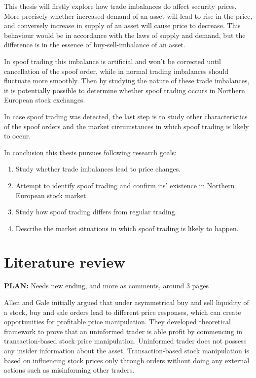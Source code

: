 \documentclass{tut-thesis}
\begin{document}
This thesis will firstly explore how trade imbalances do affect security prices. More precisely whether increased demand of an asset will lead to rise in the price, and conversely increase in supply of an asset will cause price to decrease. This behaviour would be in accordance with the laws of supply and demand, but the difference is in the essence of buy-sell-imbalance of an asset. 

In spoof trading this imbalance is artificial and won't be corrected until cancellation of the spoof order, while in normal trading imbalances should fluctuate more smoothly. Then by studying the nature of these trade imbalances, it is potentially possible to determine whether spoof trading occurs in Northern European stock exchanges. 

In case spoof trading was detected, the last step is to study other characteristics of the spoof orders and the market circumstances in which spoof trading is likely to occur.

In conclusion this thesis pursues following research goals:
\begin{enumerate}
	\item Study whether trade imbalances lead to price changes.
	\item Attempt to identify spoof trading and confirm its' existence in Northern European stock market.
	\item Study how spoof trading differs from regular trading.
	\item Describe the market situations in which spoof trading is likely to happen.
\end{enumerate}

\section{Literature review}
\textbf{PLAN:} Needs new ending, and more as comments, around 3 pages

Allen and Gale \parencite*{AllenGale1992} initially argued that under asymmetrical buy and sell liquidity of a stock, buy and sale orders lead to different price responses, which can create opportunities for profitable price manipulation. They developed theoretical framework to prove that an uninformed trader is able profit by commencing in transaction-based stock price manipulation. Uninformed trader does not possess any insider information about the asset. Transaction-based stock manipulation is based on influencing stock prices only through orders without doing any external actions such as misinforming other traders.
\end{document}
